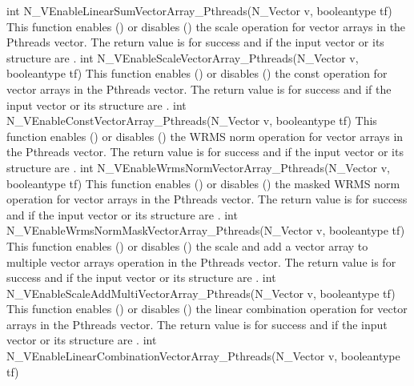 {
  int N\_VEnableLinearSumVectorArray\_Pthreads(N\_Vector v, booleantype tf)
}
{
  This function enables () or disables () the scale
  operation for vector arrays in the Pthreads vector. The return value is  for
  success and  if the input vector or its  structure are .
}
{
  int N\_VEnableScaleVectorArray\_Pthreads(N\_Vector v, booleantype tf)
}
{
  This function enables () or disables () the const
  operation for vector arrays in the Pthreads vector. The return value is  for
  success and  if the input vector or its  structure are .
}
{
  int N\_VEnableConstVectorArray\_Pthreads(N\_Vector v, booleantype tf)
}
{
  This function enables () or disables () the WRMS norm
  operation for vector arrays in the Pthreads vector. The return value is  for
  success and  if the input vector or its  structure are .
}
{
  int N\_VEnableWrmsNormVectorArray\_Pthreads(N\_Vector v, booleantype tf)
}
{
  This function enables () or disables () the masked WRMS
  norm operation for vector arrays in the Pthreads vector. The return value is
   for success and  if the input vector or its  structure are
  .
}
{
  int N\_VEnableWrmsNormMaskVectorArray\_Pthreads(N\_Vector v, booleantype tf)
}
{
  This function enables () or disables () the scale and
  add a vector array to multiple vector arrays operation in the Pthreads vector. The
  return value is  for success and  if the input vector or its
   structure are .
}
{
  int N\_VEnableScaleAddMultiVectorArray\_Pthreads(N\_Vector v,
  booleantype tf)
}
{
  This function enables () or disables () the linear
  combination operation for vector arrays in the Pthreads vector. The return value
  is  for success and  if the input vector or its  structure
  are .
}
{
  int N\_VEnableLinearCombinationVectorArray\_Pthreads(N\_Vector v,
  booleantype tf)
}
